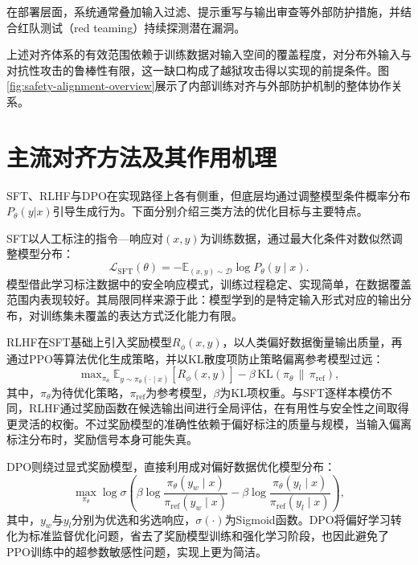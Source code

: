 在部署层面，系统通常叠加输入过滤、提示重写与输出审查等外部防护措施，并结合红队测试（red teaming）持续探测潜在漏洞\cite{rebedea2023nemo,markov2022holistic}。

上述对齐体系的有效范围依赖于训练数据对输入空间的覆盖程度，对分布外输入与对抗性攻击的鲁棒性有限，这一缺口构成了越狱攻击得以实现的前提条件。图\ref{fig:safety-alignment-overview}展示了内部训练对齐与外部防护机制的整体协作关系。


\section{主流对齐方法及其作用机理}

SFT、RLHF与DPO在实现路径上各有侧重，但底层均通过调整模型条件概率分布$P_\theta(y|x)$引导生成行为。下面分别介绍三类方法的优化目标与主要特点。

SFT以人工标注的指令—响应对$(x,y)$为训练数据，通过最大化条件对数似然调整模型分布：
\begin{equation}
\mathcal{L}_\text{SFT}(\theta) = -\mathbb{E}_{(x,y)\sim\mathcal{D}} \log P_\theta(y \mid x).
\end{equation}
模型借此学习标注数据中的安全响应模式，训练过程稳定、实现简单，在数据覆盖范围内表现较好。其局限同样来源于此：模型学到的是特定输入形式对应的输出分布，对训练集未覆盖的表达方式泛化能力有限。

RLHF在SFT基础上引入奖励模型$R_\phi(x,y)$，以人类偏好数据衡量输出质量，再通过PPO等算法优化生成策略，并以KL散度项防止策略偏离参考模型过远：
\vspace{-20pt}
\begin{equation}
\max\nolimits_{\pi_\theta} \mathbb{E}_{y \sim \pi_\theta(\cdot \mid x)}\left[R_\phi(x,y)\right]-\beta \, \mathrm{KL}\!\left(\pi_\theta \,\|\, \pi_{\mathrm{ref}}\right),
\end{equation}
其中，$\pi_\theta$为待优化策略，$\pi_{\mathrm{ref}}$为参考模型，$\beta$为KL项权重。与SFT逐样本模仿不同，RLHF通过奖励函数在候选输出间进行全局评估，在有用性与安全性之间取得更灵活的权衡。不过奖励模型的准确性依赖于偏好标注的质量与规模，当输入偏离标注分布时，奖励信号本身可能失真。

DPO则绕过显式奖励模型，直接利用成对偏好数据优化模型分布\cite{rafailov2023dpo,hong2024orpo}：
\begin{equation}
\max_{\pi_\theta} \log \sigma \!\left(\beta \log \frac{\pi_\theta(y_w \mid x)}{\pi_{\mathrm{ref}}(y_w \mid x)}-\beta \log \frac{\pi_\theta(y_l \mid x)}{\pi_{\mathrm{ref}}(y_l \mid x)}\right),
\end{equation}
其中，$y_w$与$y_l$分别为优选和劣选响应，$\sigma(\cdot)$为Sigmoid函数。DPO将偏好学习转化为标准监督优化问题，省去了奖励模型训练和强化学习阶段，也因此避免了PPO训练中的超参数敏感性问题，实现上更为简洁。


